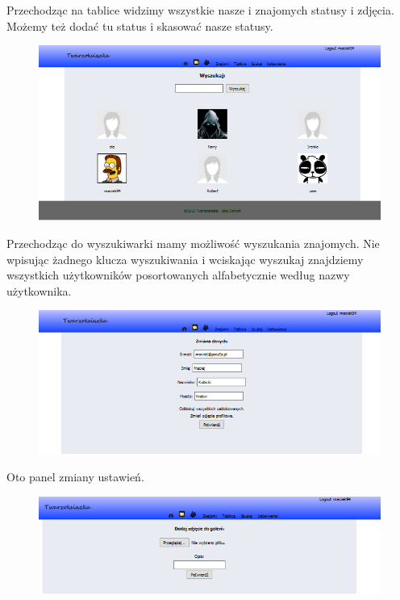 \documentclass[a4paper,10pt,table]{article}
\begin{document}
Przechodząc na tablice widzimy wszystkie nasze i znajomych statusy i zdjęcia. Możemy też dodać tu status i skasować nasze statusy.
\begin{figure}[h]
\begin{center}
\includegraphics[scale=0.5]{scrn/10}
\end{center}
\end{figure}\newline
Przechodząc do wyszukiwarki mamy możliwość wyszukania znajomych. Nie wpisując żadnego klucza wyszukiwania i wciskając wyszukaj znajdziemy wszystkich użytkowników posortowanych alfabetycznie według nazwy użytkownika.
\begin{figure}[h]
\begin{center}
\includegraphics[scale=0.65]{scrn/11}
\end{center}
\end{figure}\newline
Oto panel zmiany ustawień.
\newpage
\begin{figure}[h]
\begin{center}
\includegraphics[scale=0.65]{scrn/12}
\end{center}
\end{figure}
\end{document}
